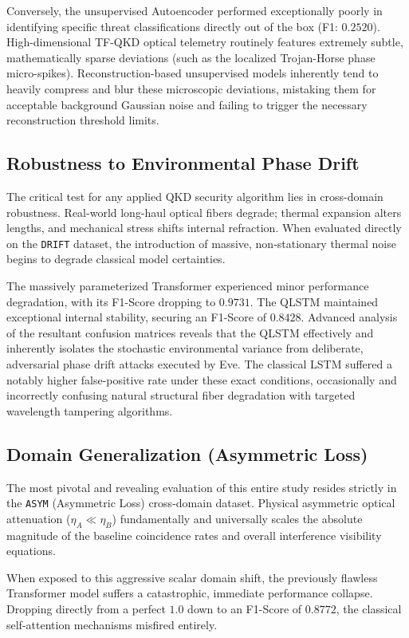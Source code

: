 \documentclass[10pt, journal, letterpaper, twocolumn]{IEEEtran}
\begin{document}
Conversely, the unsupervised Autoencoder performed exceptionally poorly in identifying specific threat classifications directly out of the box (F1: $0.2520$). High-dimensional TF-QKD optical telemetry routinely features extremely subtle, mathematically sparse deviations (such as the localized Trojan-Horse phase micro-spikes). Reconstruction-based unsupervised models inherently tend to heavily compress and blur these microscopic deviations, mistaking them for acceptable background Gaussian noise and failing to trigger the necessary reconstruction threshold limits.

\subsection{Robustness to Environmental Phase Drift}
The critical test for any applied QKD security algorithm lies in cross-domain robustness. Real-world long-haul optical fibers degrade; thermal expansion alters lengths, and mechanical stress shifts internal refraction. When evaluated directly on the \texttt{DRIFT} dataset, the introduction of massive, non-stationary thermal noise begins to degrade classical model certainties.

The massively parameterized Transformer experienced minor performance degradation, with its F1-Score dropping to $0.9731$. The QLSTM maintained exceptional internal stability, securing an F1-Score of $0.8428$. Advanced analysis of the resultant confusion matrices reveals that the QLSTM effectively and inherently isolates the stochastic environmental variance from deliberate, adversarial phase drift attacks executed by Eve. The classical LSTM suffered a notably higher false-positive rate under these exact conditions, occasionally and incorrectly confusing natural structural fiber degradation with targeted wavelength tampering algorithms.

\subsection{Domain Generalization (Asymmetric Loss)}
The most pivotal and revealing evaluation of this entire study resides strictly in the \texttt{ASYM} (Asymmetric Loss) cross-domain dataset. Physical asymmetric optical attenuation ($\eta_A \ll \eta_B$) fundamentally and universally scales the absolute magnitude of the baseline coincidence rates and overall interference visibility equations.

When exposed to this aggressive scalar domain shift, the previously flawless Transformer model suffers a catastrophic, immediate performance collapse. Dropping directly from a perfect $1.0$ down to an F1-Score of $0.8772$, the classical self-attention mechanisms misfired entirely. 
\end{document}
